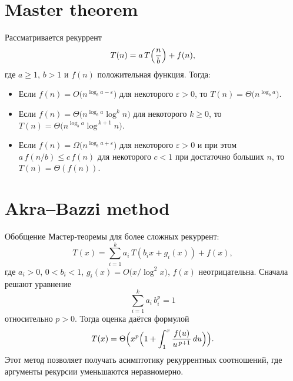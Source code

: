 \documentclass{article}
\begin{document}
\section{Master theorem}
Рассматривается рекуррент
\[
T(n)=a\,T\Bigl(\frac{n}{b}\Bigr) + f(n),
\]
где $a\ge1$, $b>1$ и $f(n)$ положительная функция. Тогда:
\begin{itemize}
	\item Если $f(n) = O\bigl(n^{\log_b a - \varepsilon}\bigr)$ для некоторого $\varepsilon>0$, то $T(n) = \Theta\bigl(n^{\log_b a}\bigr)$.
	\item Если $f(n) = \Theta\bigl(n^{\log_b a}\log^k n\bigr)$ для некоторого $k\ge0$, то $T(n) = \Theta\bigl(n^{\log_b a}\log^{\,k+1}n\bigr)$.
	\item Если $f(n) = \Omega\bigl(n^{\log_b a + \varepsilon}\bigr)$ для некоторого $\varepsilon>0$ и при этом $a\,f(n/b) \le c\,f(n)$ для некоторого $c<1$ при достаточно больших $n$, то $T(n) = \Theta(f(n))$.
\end{itemize}

\section{Akra–Bazzi method}
Обобщение Мастер-теоремы для более сложных рекуррент:
\[
T(x) = \sum_{i=1}^k a_i\,T(b_i x + g_i(x)) + f(x),
\]
где $a_i>0$, $0<b_i<1$, $g_i(x)=O\bigl(x/\log^2 x\bigr)$, $f(x)$ неотрицательна. Сначала решают уравнение 
\[
\sum_{i=1}^k a_i\,b_i^p = 1
\]
относительно $p>0$. Тогда оценка даётся формулой
\[
T(x) = \Theta\Bigl(x^p\Bigl(1 + \int_1^x \frac{f(u)}{u^{\,p+1}}\,du\Bigr)\Bigr).
\]
Этот метод позволяет получать асимптотику рекуррентных соотношений, где аргументы рекурсии уменьшаются неравномерно.
	
	
	
\end{document}
